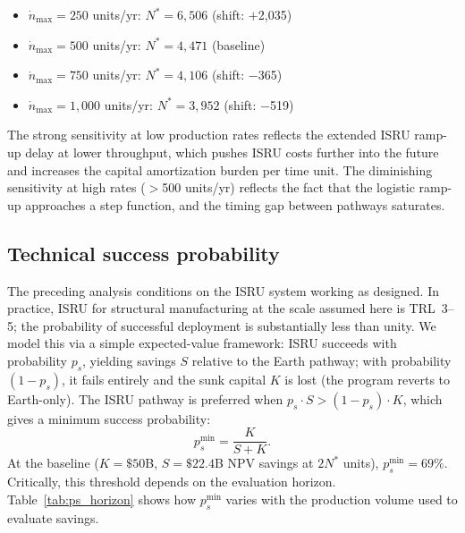 \documentclass[preprint,12pt]{elsarticle}
\begin{document}
\begin{itemize}
\item $\dot{n}_{\max} = 250$ units/yr: $N^* = 6{,}506$ (shift: $+$2{,}035)
\item $\dot{n}_{\max} = 500$ units/yr: $N^* = 4{,}471$ (baseline)
\item $\dot{n}_{\max} = 750$ units/yr: $N^* = 4{,}106$ (shift: $-$365)
\item $\dot{n}_{\max} = 1{,}000$ units/yr: $N^* = 3{,}952$ (shift: $-$519)
\end{itemize}

The strong sensitivity at low production rates reflects the extended ISRU ramp-up delay at lower throughput, which pushes ISRU costs further into the future and increases the capital amortization burden per time unit. The diminishing sensitivity at high rates ($>$500 units/yr) reflects the fact that the logistic ramp-up approaches a step function, and the timing gap between pathways saturates.

\subsection{Technical success probability}
\label{sec:success_probability}

The preceding analysis conditions on the ISRU system working as designed. In practice, ISRU for structural manufacturing at the scale assumed here is TRL~3--5; the probability of successful deployment is substantially less than unity. We model this via a simple expected-value framework: ISRU succeeds with probability $p_s$, yielding savings $S$ relative to the Earth pathway; with probability $(1 - p_s)$, it fails entirely and the sunk capital $K$ is lost (the program reverts to Earth-only). The ISRU pathway is preferred when $p_s \cdot S > (1 - p_s) \cdot K$, which gives a minimum success probability:
\begin{equation}
  p_s^{\min} = \frac{K}{S + K}.
  \label{eq:p_success}
\end{equation}
At the baseline ($K = \$50$B, $S = \$22.4$B NPV savings at $2N^*$ units), $p_s^{\min} = 69\%$. Critically, this threshold depends on the evaluation horizon. Table~\ref{tab:ps_horizon} shows how $p_s^{\min}$ varies with the production volume used to evaluate savings.
\end{document}
